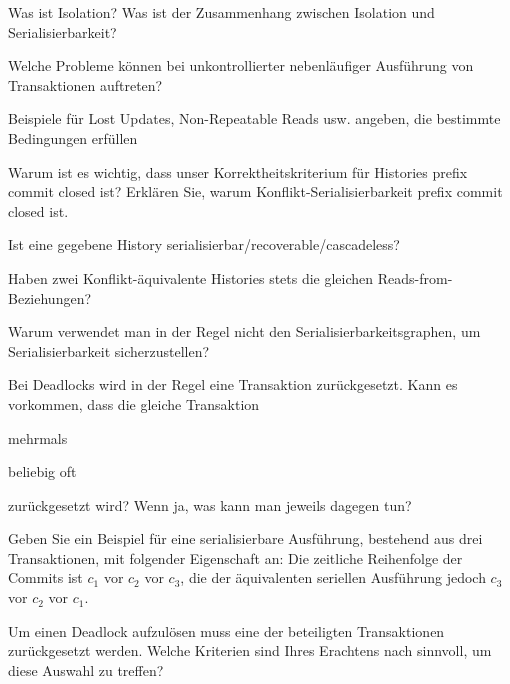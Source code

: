 \begin{fragen}
	\begin{enumeration}
		\item Was ist Isolation? Was ist der Zusammenhang zwischen Isolation und Serialisierbarkeit?
		\item Welche Probleme können bei unkontrollierter nebenläufiger Ausführung von Transaktionen auftreten?
		\item Beispiele für Lost Updates, Non-Repeatable Reads usw. angeben, die bestimmte Bedingungen erfüllen
		\item Warum ist es wichtig, dass unser Korrektheitskriterium für Histories prefix commit closed ist? Erklären Sie, warum Konflikt-Serialisierbarkeit prefix commit closed ist.
		\item Ist eine gegebene History serialisierbar/recoverable/cascadeless?
		\item Haben zwei Konflikt-äquivalente Histories stets die gleichen Reads-from-Beziehungen?
		\item Warum verwendet man in der Regel nicht den Serialisierbarkeitsgraphen, um Serialisierbarkeit sicherzustellen?
		\item Bei Deadlocks wird in der Regel eine Transaktion zurückgesetzt. Kann es vorkommen, dass die gleiche Transaktion
		\begin{enumeration}
			\item mehrmals
			\item beliebig oft
		\end{enumeration}
		zurückgesetzt wird? Wenn ja, was kann man jeweils dagegen tun?
		\item Geben Sie ein Beispiel für eine serialisierbare Ausführung, bestehend aus drei Transaktionen, mit folgender Eigenschaft an: Die zeitliche Reihenfolge der Commits ist \( c_1 \) vor \( c_2 \) vor \( c_3 \), die der äquivalenten seriellen Ausführung jedoch \( c_3 \) vor \( c_2 \) vor \( c_1 \).
		\item Um einen Deadlock aufzulösen muss eine der beteiligten Transaktionen zurückgesetzt werden. Welche Kriterien sind Ihres Erachtens nach sinnvoll, um diese Auswahl zu treffen?
	\end{enumeration}
\end{fragen}